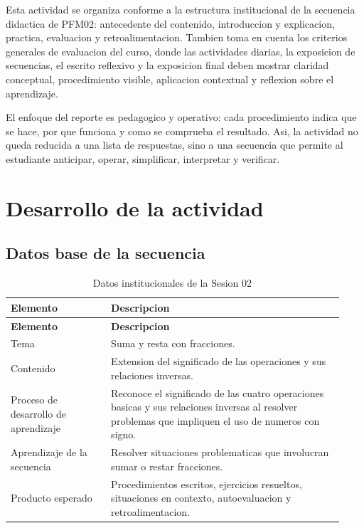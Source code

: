 \documentclass[
	spanish,
	letterpaper, oneside
]{article}
\begin{document}
Esta actividad se organiza conforme a la estructura institucional de la secuencia didactica de PFM02: antecedente del contenido, introduccion y explicacion, practica, evaluacion y retroalimentacion. Tambien toma en cuenta los criterios generales de evaluacion del curso, donde las actividades diarias, la exposicion de secuencias, el escrito reflexivo y la exposicion final deben mostrar claridad conceptual, procedimiento visible, aplicacion contextual y reflexion sobre el aprendizaje.

El enfoque del reporte es pedagogico y operativo: cada procedimiento indica que se hace, por que funciona y como se comprueba el resultado. Asi, la actividad no queda reducida a una lista de respuestas, sino a una secuencia que permite al estudiante anticipar, operar, simplificar, interpretar y verificar.

\section{Desarrollo de la actividad}

\subsection{Datos base de la secuencia}

\begin{longtable}{@{}p{0.28\linewidth}p{0.65\linewidth}@{}}
	\caption{Datos institucionales de la Sesion 02}\label{tab:datos-sesion02}\\
	\toprule
	\textbf{Elemento} & \textbf{Descripcion} \\
	\midrule
	\endfirsthead
	\toprule
	\textbf{Elemento} & \textbf{Descripcion} \\
	\midrule
	\endhead
	Tema & Suma y resta con fracciones. \\
	Contenido & Extension del significado de las operaciones y sus relaciones inversas. \\
	Proceso de desarrollo de aprendizaje & Reconoce el significado de las cuatro operaciones basicas y sus relaciones inversas al resolver problemas que impliquen el uso de numeros con signo. \\
	Aprendizaje de la secuencia & Resolver situaciones problematicas que involucran sumar o restar fracciones. \\
	Producto esperado & Procedimientos escritos, ejercicios resueltos, situaciones en contexto, autoevaluacion y retroalimentacion. \\
	\bottomrule
\end{longtable}
\end{document}
